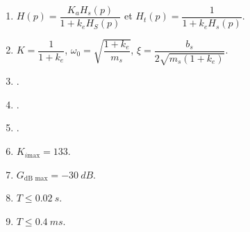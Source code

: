 \begin{multicols}{2}
\ifcolle
\else
\footnotesize
\begin{enumerate}
\item $H(p)=\dfrac{K_aH_s(p)}{1+k_e H_S(p)}$ et $H_t(p)=\dfrac{1}{1+k_e H_s(p)}$.
\item $K=\dfrac{1}{1+k_e}$, $\omega_0=\sqrt{\dfrac{1+k_e}{m_s}}$, $\xi=\dfrac{b_s}{2\sqrt{m_s\left(1+k_e\right)}}$.
\item .
\item .
\item .
\item $K_{i \text{max}} = 133$.
\item $G_{\text{dB max} } = -\SI{30}{dB} $.
\item $T\leq \SI{0,02}{s}$.
\item $T\leq \SI{0,4}{ms}$.
\end{enumerate}
\normalsize
\fi


\end{multicols}

\begin{center}
\end{center}
%
%
%
%
